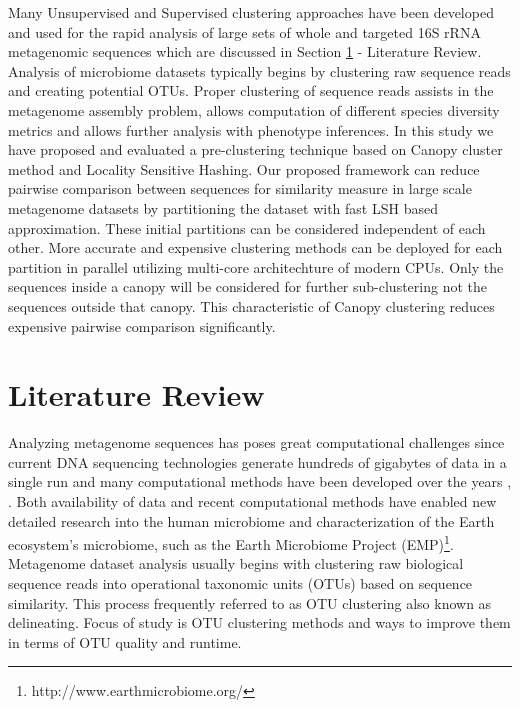 \documentclass[10pt, conference, compsocconf]{IEEEtran}
\begin{document}
Many Unsupervised and Supervised clustering approaches have been developed and used for the rapid analysis of large sets of whole and targeted 16S rRNA metagenomic sequences which are discussed in Section \ref{sec:1} - Literature Review. Analysis of microbiome datasets typically begins by clustering raw sequence reads and creating potential OTUs. Proper clustering of sequence reads assists in the metagenome assembly problem, allows computation of different species diversity metrics and allows further analysis with phenotype inferences. In this study we have proposed and evaluated a pre-clustering technique based on Canopy cluster method and Locality Sensitive Hashing. Our proposed framework can reduce pairwise comparison between sequences for similarity measure in large scale metagenome datasets by partitioning the dataset with fast LSH based approximation. These initial partitions can be considered independent of each other. More accurate and expensive clustering methods can be deployed for each partition in parallel utilizing multi-core architechture of modern CPUs. Only the sequences inside a canopy will be considered for further sub-clustering not the sequences outside that canopy. This characteristic of Canopy clustering reduces expensive pairwise comparison significantly.       

\section{Literature Review}
\label{sec:1}

Analyzing metagenome sequences has poses great computational challenges since current DNA sequencing technologies generate hundreds of gigabytes of data in a single run and many computational methods have been developed over the years \cite{MARmicroMetagenomics}, \cite{MARChallengesMeta}. Both availability of data and recent computational methods have enabled new detailed research into the human microbiome \cite{MARHumanBiome} and characterization of the Earth ecosystem’s microbiome, such as the Earth Microbiome Project (EMP)\footnote{http://www.earthmicrobiome.org/}. Metagenome dataset analysis usually begins with clustering raw biological sequence reads into operational taxonomic units (OTUs) based on sequence similarity. This process frequently referred to as OTU clustering also known as delineating. Focus of study is OTU clustering methods and ways to improve them in terms of OTU quality and runtime.
\end{document}
